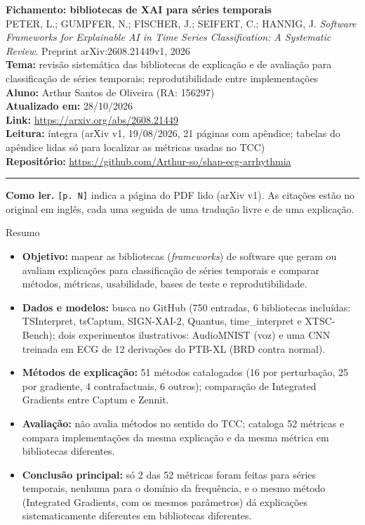 \documentclass[11pt,a4paper]{article}
\begin{document}
\begin{center}
    {\LARGE \textbf{Fichamento: bibliotecas de XAI para séries temporais}} \\[0.35em]
    {\large PETER, L.; GUMPFER, N.; FISCHER, J.; SEIFERT, C.; HANNIG, J. \textit{Software Frameworks for Explainable AI in Time Series Classification: A Systematic Review}. Preprint arXiv:2608.21449v1, 2026} \\[0.3em]
    \textbf{Tema:} revisão sistemática das bibliotecas de explicação e de avaliação para classificação de séries temporais; reprodutibilidade entre implementações \\[0.2em]
    \textbf{Aluno:} Arthur Santos de Oliveira (RA: 156297) \\[0.2em]
    \textbf{Atualizado em:} 28/10/2026 \\[0.2em]
    \textbf{Link:} \url{https://arxiv.org/abs/2608.21449} \\[0.2em]
    \textbf{Leitura:} íntegra (arXiv v1, 19/08/2026, 21 páginas com apêndice; tabelas do apêndice lidas só para localizar as métricas usadas no TCC) \\[0.2em]
    \textbf{Repositório:} \url{https://github.com/Arthur-so/shap-ecg-arrhythmia}
\end{center}
\vspace{-0.5em}
\hrule
\vspace{0.8em}

\textbf{Como ler.} \texttt{[p. N]} indica a página do PDF lido (arXiv v1). As citações estão no original em inglês, cada uma seguida de uma tradução livre e de uma explicação.

\begin{infobox}[note]{Resumo}
\begin{itemize}
\item \textbf{Objetivo:} mapear as bibliotecas (\textit{frameworks}) de software que geram ou avaliam explicações para classificação de séries temporais e comparar métodos, métricas, usabilidade, bases de teste e reprodutibilidade.
\item \textbf{Dados e modelos:} busca no GitHub (750 entradas, 6 bibliotecas incluídas: TSInterpret, tsCaptum, SIGN-XAI-2, Quantus, time\_interpret e XTSC-Bench); dois experimentos ilustrativos: AudioMNIST (voz) e uma CNN treinada em ECG de 12 derivações do PTB-XL (BRD contra normal).
\item \textbf{Métodos de explicação:} 51 métodos catalogados (16 por perturbação, 25 por gradiente, 4 contrafactuais, 6 outros); comparação de Integrated Gradients entre Captum e Zennit.
\item \textbf{Avaliação:} não avalia métodos no sentido do TCC; cataloga 52 métricas e compara implementações da mesma explicação e da mesma métrica em bibliotecas diferentes.
\item \textbf{Conclusão principal:} só 2 das 52 métricas foram feitas para séries temporais, nenhuma para o domínio da frequência, e o mesmo método (Integrated Gradients, com os mesmos parâmetros) dá explicações sistematicamente diferentes em bibliotecas diferentes.
\end{itemize}
\end{infobox}
\end{document}
